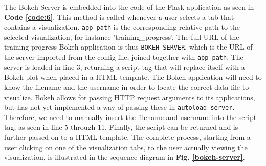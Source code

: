 \noindent The Bokeh Server is embedded into the code of the Flask application as seen in \textbf{Code \ref{code:6}}. This method is called whenever a user selects a tab that contains a visualization. \texttt{app\_path} is the corresponding relative path to the selected visualization, for instance 'training\_progress'. The full URL of the training progress Bokeh application is thus \texttt{BOKEH\_SERVER}, which is the URL of the server imported from the config file, joined together with \texttt{app\_path}. The server is loaded in line 3, returning a script tag that will replace itself with a Bokeh plot when placed in a HTML template. The Bokeh application will need to know the filename and the username in order to locate the correct data file to visualize. Bokeh allows for passing HTTP request arguments to its applications, but has not yet implemented a way of passing these in \texttt{autoload\_server}. Therefore, we need to manually insert the filename and username into the script tag, as seen in line 5 through 11. Finally, the script can be returned and is further passed on to a HTML template. The complete process, starting from a user clicking on one of the visualization tabs, to the user actually viewing the visualization, is illustrated in the sequence diagram in \textbf{Fig. \ref{bokeh-server}}.



